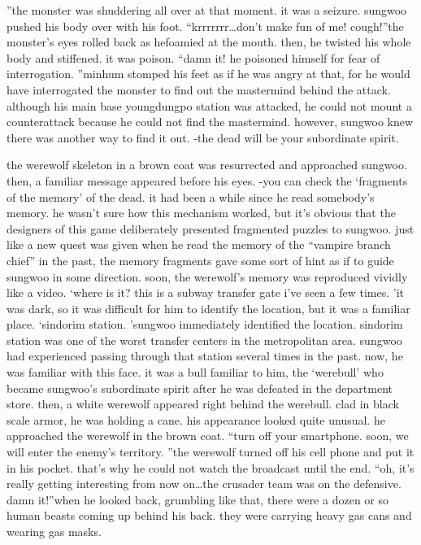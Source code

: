 ”the monster was shuddering all over at that moment.
 it was a seizure.
 sungwoo pushed his body over with his foot.
“krrrrrrr…don’t make fun of me! cough!”the monster’s eyes rolled back as hefoamied at the mouth.
 then, he twisted his whole body and stiffened.
 it was poison.
“damn it! he poisoned himself for fear of interrogation.
”minhum stomped his feet as if he was angry at that, for he would have interrogated the monster to find out the mastermind behind the attack.
 although his main base youngdungpo station was attacked, he could not mount a counterattack because he could not find the mastermind.
however, sungwoo knew there was another way to find it out.
-the dead will be your subordinate spirit.

the werewolf skeleton in a brown coat was resurrected and approached sungwoo.
then, a familiar message appeared before his eyes.
-you can check the ‘fragments of the memory’ of the dead.
it had been a while since he read somebody’s memory.
 he wasn’t sure how this mechanism worked, but it’s obvious that the designers of this game deliberately presented fragmented puzzles to sungwoo.
just like a new quest was given when he read the memory of the “vampire branch chief” in the past, the memory fragments gave some sort of hint as if to guide sungwoo in some direction.
soon, the werewolf’s memory was reproduced vividly like a video.
‘where is it? this is a subway transfer gate i’ve seen a few times.
’it was dark, so it was difficult for him to identify the location, but it was a familiar place.
‘sindorim station.
’sungwoo immediately identified the location.
 sindorim station was one of the worst transfer centers in the metropolitan area.
 sungwoo had experienced passing through that station several times in the past.
now, he was familiar with this face.
 it was a bull familiar to him, the ‘werebull’ who became sungwoo’s subordinate spirit after he was defeated in the department store.
then, a white werewolf appeared right behind the werebull.
clad in black scale armor, he was holding a cane.
 his appearance looked quite unusual.
he approached the werewolf in the brown coat.
“turn off your smartphone.
 soon, we will enter the enemy’s territory.
”the werewolf turned off his cell phone and put it in his pocket.
 that’s why he could not watch the broadcast until the end.
“oh, it’s really getting interesting from now on…the crusader team was on the defensive.
 damn it!”when he looked back, grumbling like that, there were a dozen or so human beasts coming up behind his back.
 they were carrying heavy gas cans and wearing gas masks.
